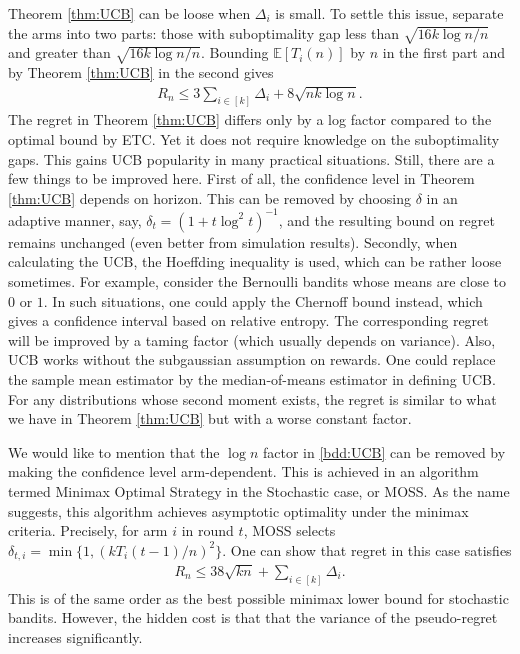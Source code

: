 \documentclass[10pt,a4article]{amsart}
\numberwithin{equation}{section}
\theoremstyle{plain}
\theoremstyle{definition}
\def\E{{\mathbb E}}
\begin{document}
Theorem \ref{thm:UCB} can be loose when $\Delta_i$ is small. To settle this issue, separate the  arms into two parts: those with suboptimality gap less than $\sqrt{16k\log n/n}$ and greater than $\sqrt{16k\log n/n}$. Bounding $\E[T_i(n)]$ by $n$ in the first part and by Theorem \ref{thm:UCB} in the second gives
\begin{align}
R_n\leq 3\sum_{i\in [k]}\Delta_i + 8\sqrt{nk\log n}. \label{bdd:UCB}
\end{align} 
The regret in Theorem \ref{thm:UCB} differs only by a log factor compared to the optimal bound by ETC. Yet it does not require knowledge on the suboptimality gaps. This gains UCB popularity in many practical situations. Still, there are a few things to be improved here. First of all, the confidence level in Theorem \ref{thm:UCB} depends on horizon. This can be removed by choosing $\delta$ in an adaptive manner, say, $\delta_t = (1+t\log^2 t)^{-1}$, and the resulting bound on regret remains unchanged (even better from simulation results). Secondly, when calculating the UCB, the Hoeffding inequality is used, which can be rather loose sometimes. For example, consider the Bernoulli bandits whose means are close to $0$ or $1$. In such situations, one could apply the Chernoff bound instead, which gives a confidence interval based on relative entropy. The corresponding regret will be improved by a taming factor (which usually depends on variance). Also, UCB works without the subgaussian assumption on rewards. One could replace the sample mean estimator by the median-of-means estimator in defining UCB. For any distributions whose second moment exists, the regret is similar to what we have in Theorem \ref{thm:UCB} but with a worse constant factor. 

We would like to mention that the $\log n$ factor in \eqref{bdd:UCB} can be removed by making the confidence level arm-dependent. This is achieved in an algorithm termed Minimax Optimal Strategy in the Stochastic case, or MOSS.  As the name suggests, this algorithm achieves asymptotic optimality under the minimax criteria. Precisely, for arm $i$ in round $t$,  MOSS selects $\delta_{t, i}=\min\{1, (kT_i(t-1)/n)^2\}$. One can show that regret in this case satisfies
\begin{align*}
R_n\leq 38\sqrt{kn}+\sum_{i\in [k]}\Delta_i. 
\end{align*}
This is of the same order as the best possible minimax lower bound for stochastic bandits. However, the hidden cost is that that the variance of the pseudo-regret increases significantly.
\end{document}

